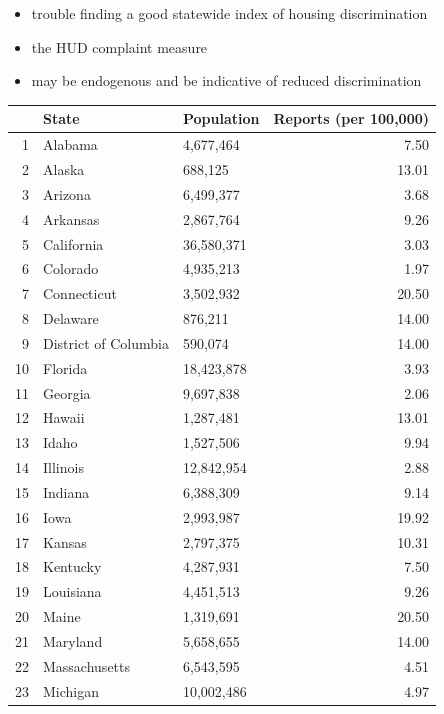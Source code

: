 \documentclass{article}
\begin{document}
  \begin{itemize}
    \item trouble finding a good statewide index of housing discrimination
    \item the HUD complaint measure
    \item may be endogenous and be indicative of reduced discrimination
  
  \end{itemize}
\begin{table}[ht]
\centering
\begin{tabular}{rllr}
  \hline
 & State & Population & Reports (per 100,000) \\ 
  \hline
1 & Alabama & 4,677,464 & 7.50 \\ 
  2 & Alaska & 688,125 & 13.01 \\ 
  3 & Arizona & 6,499,377 & 3.68 \\ 
  4 & Arkansas & 2,867,764 & 9.26 \\ 
  5 & California & 36,580,371 & 3.03 \\ 
  6 & Colorado & 4,935,213 & 1.97 \\ 
  7 & Connecticut & 3,502,932 & 20.50 \\ 
  8 & Delaware & 876,211 & 14.00 \\ 
  9 & District of Columbia & 590,074 & 14.00 \\ 
  10 & Florida & 18,423,878 & 3.93 \\ 
  11 & Georgia & 9,697,838 & 2.06 \\ 
  12 & Hawaii & 1,287,481 & 13.01 \\ 
  13 & Idaho & 1,527,506 & 9.94 \\ 
  14 & Illinois & 12,842,954 & 2.88 \\ 
  15 & Indiana & 6,388,309 & 9.14 \\ 
  16 & Iowa & 2,993,987 & 19.92 \\ 
  17 & Kansas & 2,797,375 & 10.31 \\ 
  18 & Kentucky & 4,287,931 & 7.50 \\ 
  19 & Louisiana & 4,451,513 & 9.26 \\ 
  20 & Maine & 1,319,691 & 20.50 \\ 
  21 & Maryland & 5,658,655 & 14.00 \\ 
  22 & Massachusetts & 6,543,595 & 4.51 \\ 
  23 & Michigan & 10,002,486 & 4.97 \\ 

\end{tabular}
\end{table}
\end{document}
